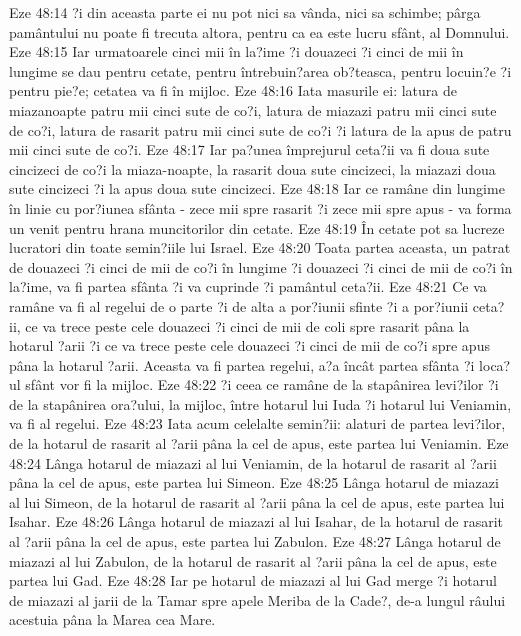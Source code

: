 Eze 48:14  ?i din aceasta parte ei nu pot nici sa vânda, nici sa schimbe; pârga pamântului nu poate fi trecuta altora, pentru ca ea este lucru sfânt, al Domnului.
Eze 48:15  Iar urmatoarele cinci mii în la?ime ?i douazeci ?i cinci de mii în lungime se dau pentru cetate, pentru întrebuin?area ob?teasca, pentru locuin?e ?i pentru pie?e; cetatea va fi în mijloc.
Eze 48:16  Iata masurile ei: latura de miazanoapte patru mii cinci sute de co?i, latura de miazazi patru mii cinci sute de co?i, latura de rasarit patru mii cinci sute de co?i ?i latura de la apus de patru mii cinci sute de co?i.
Eze 48:17  Iar pa?unea împrejurul ceta?ii va fi doua sute cincizeci de co?i la miaza-noapte, la rasarit doua sute cincizeci, la miazazi doua sute cincizeci ?i la apus doua sute cincizeci.
Eze 48:18  Iar ce ramâne din lungime în linie cu por?iunea sfânta - zece mii spre rasarit ?i zece mii spre apus - va forma un venit pentru hrana muncitorilor din cetate.
Eze 48:19  În cetate pot sa lucreze lucratori din toate semin?iile lui Israel.
Eze 48:20  Toata partea aceasta, un patrat de douazeci ?i cinci de mii de co?i în lungime ?i douazeci ?i cinci de mii de co?i în la?ime, va fi partea sfânta ?i va cuprinde ?i pamântul ceta?ii.
Eze 48:21  Ce va ramâne va fi al regelui de o parte ?i de alta a por?iunii sfinte ?i a por?iunii ceta?ii, ce va trece peste cele douazeci ?i cinci de mii de coli spre rasarit pâna la hotarul ?arii ?i ce va trece peste cele douazeci ?i cinci de mii de co?i spre apus pâna la hotarul ?arii. Aceasta va fi partea regelui, a?a încât partea sfânta ?i loca?ul sfânt vor fi la mijloc.
Eze 48:22  ?i ceea ce ramâne de la stapânirea levi?ilor ?i de la stapânirea ora?ului, la mijloc, între hotarul lui Iuda ?i hotarul lui Veniamin, va fi al regelui.
Eze 48:23  Iata acum celelalte semin?ii: alaturi de partea levi?ilor, de la hotarul de rasarit al ?arii pâna la cel de apus, este partea lui Veniamin.
Eze 48:24  Lânga hotarul de miazazi al lui Veniamin, de la hotarul de rasarit al ?arii pâna la cel de apus, este partea lui Simeon.
Eze 48:25  Lânga hotarul de miazazi al lui Simeon, de la hotarul de rasarit al ?arii pâna la cel de apus, este partea lui Isahar.
Eze 48:26  Lânga hotarul de miazazi al lui Isahar, de la hotarul de rasarit al ?arii pâna la cel de apus, este partea lui Zabulon.
Eze 48:27  Lânga hotarul de miazazi al lui Zabulon, de la hotarul de rasarit al ?arii pâna la cel de apus, este partea lui Gad.
Eze 48:28  Iar pe hotarul de miazazi al lui Gad merge ?i hotarul de miazazi al jarii de la Tamar spre apele Meriba de la Cade?, de-a lungul râului acestuia pâna la Marea cea Mare.
